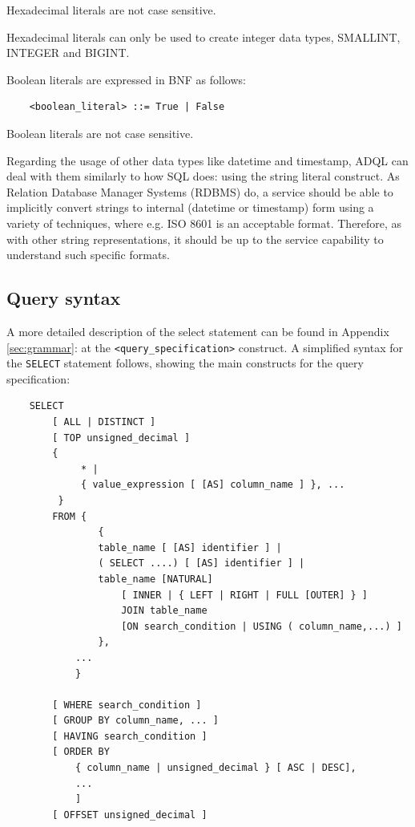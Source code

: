 \documentclass[11pt,a4paper]{ivoa}
\begin{document}
Hexadecimal literals are not case sensitive.

Hexadecimal literals can only be used to create integer data types, SMALLINT, INTEGER and BIGINT.

Boolean literals are expressed in BNF as follows:

\begin{verbatim}
    <boolean_literal> ::= True | False
\end{verbatim}

Boolean literals are not case sensitive.

Regarding the usage of other data types like datetime and timestamp, ADQL
can deal with them similarly to how SQL does: using the string literal
construct. As Relation Database Manager Systems (RDBMS) do, a service should
be able to implicitly convert strings to internal (datetime or timestamp)
form using a variety of techniques, where e.g. ISO 8601 is an acceptable
format. Therefore, as with other string representations, it should be up to
the service capability to understand such specific formats.

\clearpage
\subsection{Query syntax}
\label{sec:syntax}

A more detailed description of the select statement can be found in Appendix \ref{sec:grammar}:
 at the \verb:<query_specification>: construct.
A simplified syntax for the \verb:SELECT: statement follows, showing the main constructs for
the query specification:

\begin{verbatim}
    SELECT
        [ ALL | DISTINCT ]
        [ TOP unsigned_decimal ]
        {
             * |
             { value_expression [ [AS] column_name ] }, ...
         }
        FROM {
                {
                table_name [ [AS] identifier ] |
                ( SELECT ....) [ [AS] identifier ] |
                table_name [NATURAL]
                    [ INNER | { LEFT | RIGHT | FULL [OUTER] } ]
                    JOIN table_name
                    [ON search_condition | USING ( column_name,...) ]
                },
            ...
            }

        [ WHERE search_condition ]
        [ GROUP BY column_name, ... ]
        [ HAVING search_condition ]
        [ ORDER BY
            { column_name | unsigned_decimal } [ ASC | DESC],
            ...
            ]
        [ OFFSET unsigned_decimal ]
\end{verbatim}
\end{document}
